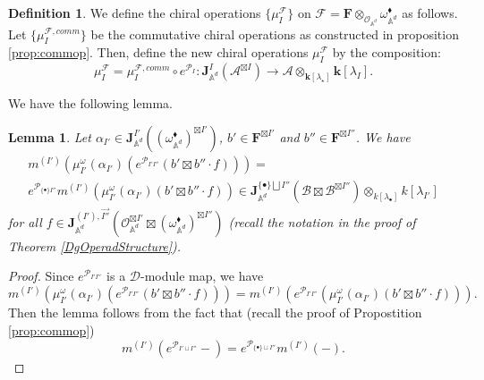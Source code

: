 \documentclass[11pt]{amsart}
\newtheorem{lem}[thm]{Lemma}
\theoremstyle{definition}
\newtheorem{defn}[thm]{Definition}
\theoremstyle{remark}
\numberwithin{equation}{section}
\newcommand{\cF}{\mathcal{F}}
\begin{document}
\begin{defn}
  We define the chiral operations $\{\mu_I^{\mathcal{F}}\}$ on $\mathcal{F}=\mathbf{F}\otimes_{\mathcal{O}_{\mathbb{A}^d}} \omega_{\mathbb{A}^d}^{\blacklozenge}$ as follows.
  Let $\{\mu_I^{\cF,comm}\}$ be the commutative chiral operations as constructed in proposition \ref{prop:commop}.
  Then, define the new chiral operations $\mu_I^{\mathcal{F}}$ by the composition:
$$
\mu^{\mathcal{F}}_{{I}}=\mu^{\mathcal{F},comm}_{I}\circ e^{\mathcal{P}_{{I}}} \colon \mathbf{J}_{\mathbb{A}^d}^{{I}}\left(\mathcal{A}^{\boxtimes{I}} \right)\rightarrow \mathcal{A}\otimes_{\mathbf{k}[\lambda_{\star}]}\mathbf{k}[\lambda_{I}].
$$
\end{defn}

We have the following lemma.

\begin{lem}
    Let $\alpha_{{I'}}\in \mathbf{J}_{\mathbb{A}^d}^{{I'}}((\omega_{\mathbb{A}^d}^{\blacklozenge})^{\boxtimes {I'}}) $,
    $b'\in \mathbf{F}^{\boxtimes {I'}}$ and $b''\in \mathbf{F}^{\boxtimes {I''}}$. We have
    \begin{multline}
    m^{(I')}\left(\mu^{\omega}_{{I'}}(\alpha_{{I'}})(    e^{{\mathcal{P}}_{{I'}{I''}}}(b'\boxtimes
    b''\cdot f ))\right)=\\ e^{{\mathcal{P}}_{\{\bullet\}{I''}}}m^{(I')}\left(\mu^{\omega}_{{I'}}(\alpha_{{I'}})(b'\boxtimes b''\cdot f) \right)\in \mathbf{J}^{\{\bullet\}\bigsqcup{I''}}_{\mathbb{A}^d}(\mathcal{B}\boxtimes \mathcal{B}^{\boxtimes{I''}})\otimes_{k[\lambda_{\bullet}]}k[\lambda_{I'}]
  \end{multline}
    for all $f\in \mathbf{J}^{({I'}),\vec{{I''}}}_{\mathbb{A}^d}(\mathcal{O}_{\mathbb{A}^d}^{\boxtimes{I'}}\boxtimes(\omega_{\mathbb{A}^d}^{\blacklozenge})^{\boxtimes{I''}})
$ (recall the notation in the proof of Theorem \ref{DgOperadStructure}).
\end{lem}
\begin{proof}
Since $  e^{{\mathcal{P}}_{{I'}{I''}}}$ is a $\mathcal{D}$-module map, we have
$$
m^{(I')}\left(\mu^{\omega}_{{I'}}(\alpha_{{I'}})(    e^{{\mathcal{P}}_{{I'}{I''}}}(b'\boxtimes b''\cdot f ))\right)=m^{(I')}\left(e^{{\mathcal{P}}_{{I'}{I''}}}(\mu^{\omega}_{{I'}}(\alpha_{{I'}})(    b'\boxtimes b''\cdot f ))\right).
$$
Then the lemma follows from the fact that (recall the proof of Propostition \ref{prop:commop})
$$
m^{(I')}\left(e^{{\mathcal{P}}_{I' \sqcup I''}}-\right)=e^{{\mathcal{P}}_{\{\bullet\} \sqcup I''}}m^{(I')}\left(-\right).
$$
\iffalse

    This follows from the following observation
    $$
    \lambda^s_{i'}\cdot \left(b'\boxtimes b''\cdot f\cdot e^{\overleftarrow{\mathcal{P}}_{\vec{I'}\vec{I''}}}\right)=\partial_{z^s_{i'}}b'\boxtimes b''\cdot f\cdot e^{\overleftarrow{\mathcal{P}}_{\vec{I'}\vec{I''}}}+b'\boxtimes b''\cdot e^{\overleftarrow{\mathcal{P}}_{\vec{I'}\vec{I''}}}\cdot \lambda^s_{i'} \cdot f.
    $$
\fi

\end{proof}
\end{document}
